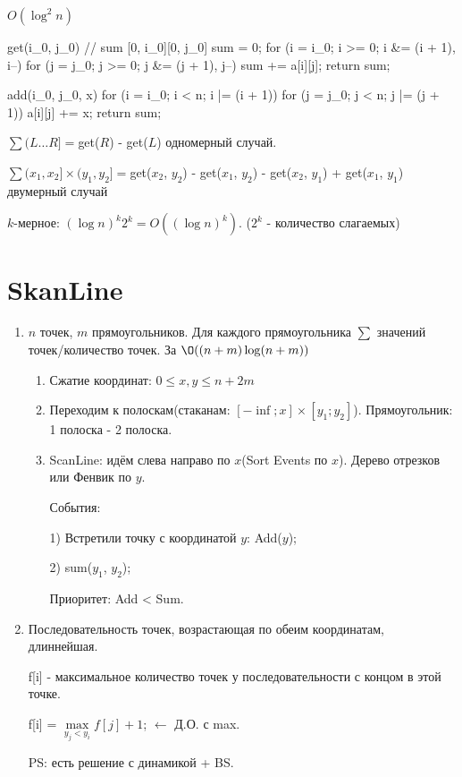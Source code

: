 $O(\log^2 n)$

\begin{cppcode}
	get(i_0, j_0) { // sum [0, i_0][0, j_0]
		sum = 0;
		for (i = i_0; i >= 0; i &= (i + 1), i--)
			for (j = j_0; j >= 0; j &= (j + 1), j--)
				sum += a[i][j];
		return sum;
   }
\end{cppcode}

\begin{cppcode}
	add(i_0, j_0, x) { 
		for (i = i_0; i < n; i |= (i + 1))
			for (j = j_0; j < n; j |= (j + 1))
				a[i][j] += x;
		return sum;
   }
\end{cppcode}

$\sum(L \dots R] = $get($R$) - get($L$) одномерный случай.

$\sum(x_1, x_2]\times(y_1, y_2] = $get($x_2$, $y_2$) - get($x_1$, $y_2$) - get($x_2$, $y_1$) + get($x_1$, $y_1$) двумерный случай

$k$-мерное: $(\log n)^k2^k = O((\log n)^k)$. ($2^k$ - количество слагаемых)

\section{SkanLine}

\begin{enumerate}
	\item $n$ точек, $m$ прямоугольников. Для каждого прямоугольника  $\sum$ значений точек/количество точек. За $\O((n + m)\log(n + m))$
	\begin{enumerate}
		\item Сжатие координат: $0 \le x, y \le n + 2m$
		\item Переходим к полоскам(стаканам: $[-\inf; x]\times[y_1; y_2]$). Прямоугольник: 1 полоска - 2 полоска.
		\item ScanLine: идём слева направо по $x$(Sort Events по $x$). Дерево отрезков или Фенвик по $y$.

		События:

		1) Встретили точку с координатой $y$: Add($y$);

		2) sum($y_1$, $y_2$);

		Приоритет: Add < Sum.
	\end{enumerate}
	\item Последовательность точек, возрастающая по обеим координатам, длиннейшая.

	f[i] - максимальное количество точек у последовательности с концом в этой точке.

	f[i] = $\max\limits_{y_j < y_i} f[j] + 1$; $\leftarrow$ Д.О. с max.

	PS: есть решение с динамикой + BS.
\end{enumerate}